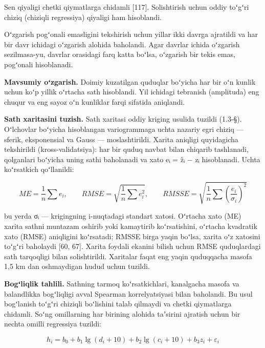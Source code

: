 Sen qiyaligi chetki qiymatlarga chidamli {[}117{]}. Solishtirish uchun
oddiy toʻgʻri chiziq (chiziqli regressiya) qiyaligi ham hisoblandi.

Oʻzgarish pogʻonali emasligini tekshirish uchun yillar ikki davrga
ajratildi va har bir davr ichidagi oʻzgarish alohida baholandi. Agar
davrlar ichida oʻzgarish sezilmasa-yu, davrlar orasidagi farq katta
boʻlsa, oʻzgarish bir tekis emas, pogʻonali hisoblanadi.

\textbf{Mavsumiy oʻzgarish.} Doimiy kuzatilgan quduqlar boʻyicha har bir
oʻn kunlik uchun koʻp yillik oʻrtacha sath hisoblandi. Yil ichidagi
tebranish (amplituda) eng chuqur va eng sayoz oʻn kunliklar farqi
sifatida aniqlandi.

\textbf{Sath xaritasini tuzish.} Sath xaritasi oddiy kriging usulida
tuzildi (1.3-§). Oʻlchovlar boʻyicha hisoblangan variogrammaga uchta
nazariy egri chiziq --- sferik, eksponensial va Gauss ---
moslashtirildi. Xarita aniqligi quyidagicha tekshirildi
(kross-validatsiya): har bir quduq navbat bilan chiqarib tashlanadi,
qolganlari boʻyicha uning sathi baholanadi va xato eᵢ = ẑᵢ − zᵢ
hisoblanadi. Uchta koʻrsatkich qoʻllanildi:

\begin{equation}\tag{2.9}
ME = \frac{1}{n}\sum e_i, \qquad RMSE = \sqrt{\frac{1}{n}\sum e_i^2}, \qquad RMSSE = \sqrt{\frac{1}{n}\sum \left(\frac{e_i}{\sigma_i}\right)^2}
\end{equation}

bu yerda σᵢ --- krigingning i-nuqtadagi standart xatosi. Oʻrtacha xato
(ME) xarita sathni muntazam oshirib yoki kamaytirib koʻrsatishini,
oʻrtacha kvadratik xato (RMSE) aniqligini koʻrsatadi; RMSSE birga yaqin
boʻlsa, xarita oʻz xatosini toʻgʻri baholaydi {[}60, 67{]}. Xarita
foydali ekanini bilish uchun RMSE quduqlardagi sath tarqoqligi bilan
solishtirildi. Xaritalar faqat eng yaqin quduqqacha masofa 1,5 km dan
oshmaydigan hudud uchun tuzildi.

\textbf{Bogʻliqlik tahlili.} Sathning tarmoq koʻrsatkichlari, kanalgacha
masofa va balandlikka bogʻliqligi avval Spearman korrelyatsiyasi bilan
baholandi. Bu usul bogʻlanish toʻgʻri chiziqli boʻlishini talab qilmaydi
va chetki qiymatlarga chidamli. Soʻng omillarning har birining alohida
taʼsirini ajratish uchun bir nechta omilli regressiya tuzildi:

\begin{equation}\tag{2.10}
h_i = b_0 + b_1 \lg(d_i + 10) + b_2 \lg(c_i + 10) + b_3 z_i + \varepsilon_i
\end{equation}


